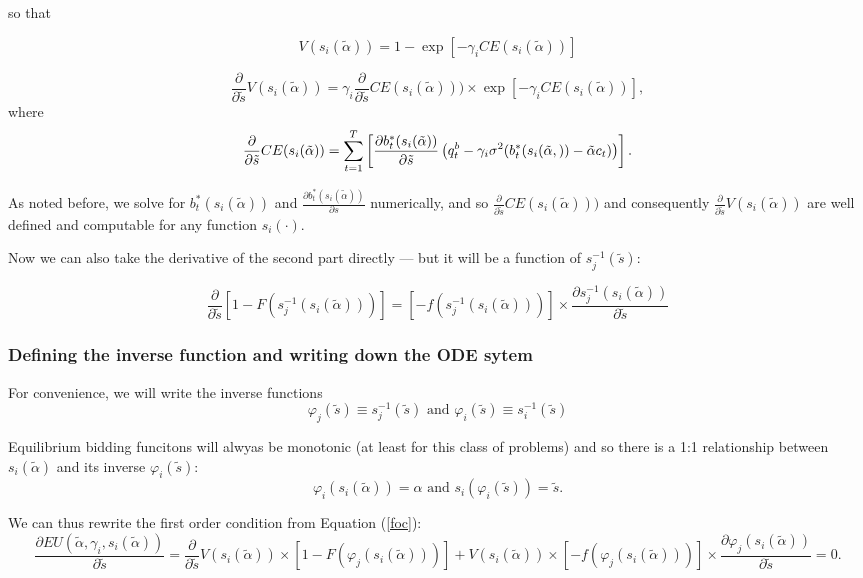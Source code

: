 \documentclass[
]{article}
\begin{document}
so that

\[
V(s_{i}(\tilde{\alpha}))  = 1 - \exp[-{\gamma_i}CE(s_{i}(\tilde{\alpha}))]
\]

\[
\frac{\partial}{\partial \tilde{s}}V(s_{i}(\tilde{\alpha}))= {\gamma_i} \frac{\partial}{\partial \tilde{s}} CE(s_{i}(\tilde{\alpha}))) \times \exp[-{\gamma_i}CE(s_{i}(\tilde{\alpha}))],
\] where \[
\frac{\partial}{\partial \tilde{s}} CE(s_{i}(\tilde{\alpha})) = \sum_{t=1}^{T} \left[\frac{\partial b_t^{*}(s_{i}(\tilde{\alpha}))}{\partial \tilde{s}} \large\left(q_t^{b} - {\gamma_i} \sigma^{2}(b_t^{*}(s_{i}(\tilde{\alpha},))- \tilde{\alpha} c_t) \large\right)\right].
\]

As noted before, we solve for \(b_t^{*}(s_{i}(\tilde{\alpha}))\) and
\(\frac{\partial b_t^{*}(s_{i}(\tilde{\alpha}))}{\partial s}\)
numerically, and so
\(\frac{\partial}{\partial \tilde{s}} CE( s_{i}(\tilde{\alpha})))\) and
consequently
\(\frac{\partial}{\partial \tilde{s}}V(s_{i}(\tilde{\alpha}))\) are well
defined and computable for any function \(s_{i}(\cdot)\).

Now we can also take the derivative of the second part directly --- but
it will be a function of \(s_{j}^{-1}(\tilde{s})\):

\[
\frac{\partial}{\partial \tilde{s}}[1 - F(s_{j}^{-1}(s_{i}(\tilde{\alpha}))) ] =  [-f(s_{j}^{-1}(s_{i}(\tilde{\alpha})))] \times \frac{\partial s_{j}^{-1}(s_{i}(\tilde{\alpha}))}{\partial \tilde{s}}
\]

\hypertarget{defining-the-inverse-function-and-writing-down-the-ode-sytem}{%
\subsubsection{Defining the inverse function and writing down the ODE
sytem}\label{defining-the-inverse-function-and-writing-down-the-ode-sytem}}

For convenience, we will write the inverse functions \[
\varphi_j(\tilde{s}) \equiv s_{j}^{-1}(\tilde{s}) \text{  and  } \varphi_i(\tilde{s}) \equiv s_{i}^{-1}(\tilde{s}) 
\]

Equilibrium bidding funcitons will alwyas be monotonic (at least for
this class of problems) and so there is a 1:1 relationship between
\(s_{i}(\tilde{\alpha})\) and its inverse \(\varphi_i(\tilde{s})\): \[
\varphi_i(s_{i}(\tilde{\alpha})) = \alpha \text{  and  } s_{i}(\varphi_i(\tilde{s})) = \tilde{s}.
\]

We can thus rewrite the first order condition from Equation (\ref{foc}):
 \[
\frac{\partial EU(\tilde{\alpha}, {\gamma}_i, s_{i}(\tilde{\alpha}))}{\partial \tilde{s}}  =  
\frac{\partial}{\partial \tilde{s}}V(s_{i}(\tilde{\alpha}))  \times [1 - F(\varphi_j(s_{i}(\tilde{\alpha}))) ] + V(s_{i}(\tilde{\alpha})) \times [-f(\varphi_j(s_{i}(\tilde{\alpha})))] \times \frac{\partial \varphi_j(s_{i}(\tilde{\alpha}))}{\partial \tilde{s}}
= 0.
\]
\end{document}
